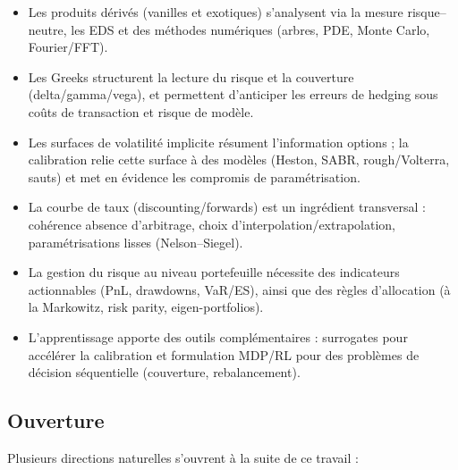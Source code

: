 \documentclass[11pt,a4paper]{article}
\newcommand{\1}{\mathbf{1}}
\begin{document}
\begin{itemize}
  \item Les produits d\'eriv\'es (vanilles et exotiques) s'analysent via la mesure risque--neutre, les EDS et des
        m\'ethodes num\'eriques (arbres, PDE, Monte Carlo, Fourier/FFT).
  \item Les Greeks structurent la lecture du risque et la couverture (delta/gamma/vega), et permettent d'anticiper les
        erreurs de hedging sous co\^uts de transaction et risque de mod\`ele.
  \item Les surfaces de volatilit\'e implicite r\'esument l'information options ; la calibration relie cette surface \`a des
        mod\`eles (Heston, SABR, rough/Volterra, sauts) et met en \'evidence les compromis de param\'etrisation.
  \item La courbe de taux (discounting/forwards) est un ingr\'edient transversal : coh\'erence absence d'arbitrage,
        choix d'interpolation/extrapolation, param\'etrisations lisses (Nelson--Siegel).
  \item La gestion du risque au niveau portefeuille n\'ecessite des indicateurs actionnables (PnL, drawdowns, VaR/ES),
        ainsi que des r\`egles d'allocation (\`a la Markowitz, risk parity, eigen-portfolios).
  \item L'apprentissage apporte des outils compl\'ementaires : surrogates pour acc\'el\'erer la calibration et formulation
        MDP/RL pour des probl\`emes de d\'ecision s\'equentielle (couverture, rebalancement).
\end{itemize}

\subsection{Ouverture}

Plusieurs directions naturelles s'ouvrent à la suite de ce travail :
\end{document}
